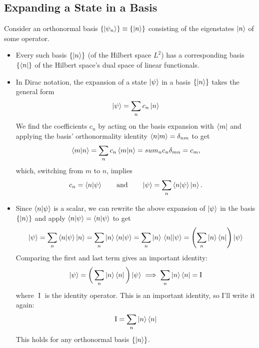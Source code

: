 \documentclass[11pt, a4paper]{article}
\newcommand{\eqtext}[1]{\qquad \text{#1} \qquad}
\newcommand{\p}{\psi}  %
\begin{document}
\subsection{Expanding a State in a Basis}
Consider an orthonormal basis $ \{\ket{\psi_{n}}\} \equiv \{\ket{n}\} $ consisting of the eigenstates $ \ket{n} $ of some operator. 
\begin{itemize}
	\item Every such basis $ \{\ket{n}\} $ (of the Hilbert space $ L^{2} $) has a corresponding basis $ \{\bra{n}\} $ of the Hilbert space's dual space of linear functionals. 
	
	\item In Dirac notation, the expansion of a state $ \ket{\p} $ in a basis $ \{\ket{n}\} $ takes the general form
	\begin{equation*}
		\ket{\psi} = \sum_{n}c_{n} \ket{n}
	\end{equation*}
	We find the coefficients $ c_{n} $ by acting on the basis expansion with $ \bra{m} $ and applying the basis' orthonormality identity $ \braket{n}{m} = \delta_{nm} $ to get
	\begin{equation*}
		\braket{m}{n} = \sum_{n}c_{n} \braket{m}{n} = sum_{n}c_{n}\delta_{mn} = c_{m},
	\end{equation*}
	which, switching from $ m $ to $ n $, implies
	\begin{equation*}
		c_{n} = \braket{n}{\psi} \eqtext{and} \ket{\psi} = \sum_{n} \braket{n}{\psi} \ket{n}.
	\end{equation*}
	
	\item Since $ \braket{n}{\psi} $ is a scalar, we can rewrite the above expansion of $ \ket{\psi} $ in the basis $ \{\ket{n}\} $ and apply $ \braket{n}{\psi} = \bra{n}\ket{\psi} $ to get
	\begin{equation*}
		\ket{\psi} = \sum_{n} \braket{n}{\psi} \ket{n} = \sum_{n} \ket{n} \braket{n}{\psi} = \sum_{n} \ket{n} \mel{n}{}{\psi} = \left(\sum_{n} \ket{n} \bra{n}\right) \ket{\psi}
	\end{equation*}
	Comparing the first and last term gives an important identity:
	\begin{equation*}
		\ket{\p} = \bigg(\sum_{n} \ket{n} \bra{n}\bigg) \ket{\psi} \implies \sum_{n} \ket{n} \bra{n} = \operatorname{I}
	\end{equation*}
	where $ \operatorname{I} $ is the identity operator. This is an important identity, so I'll write it again:
	\begin{equation*}
		\operatorname{I} = \sum_{n} \ket{n} \bra{n}
	\end{equation*}
	This holds for any orthonormal basis $ \{\ket{n}\} $.

\end{itemize}
\end{document}
